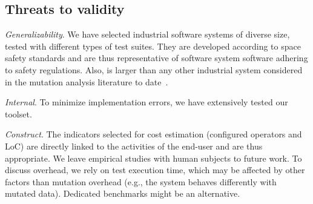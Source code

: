 






\subsection{Threats to validity} 
\label{sec:threats:damat}


\emph{Generalizability}. We have selected industrial software systems of diverse size, tested with different types of test suites. They are developed according to space safety standards and are thus  representative of software system software adhering to safety regulations. 
Also, \ESAIL is larger than any other industrial system considered in the mutation analysis literature to date~\cite{Ramler2017,delgado2018evaluation,Baker2013,denisov2018mull}.

{\emph{Internal}. To minimize implementation errors, we have extensively tested our toolset.}

{\emph{Construct}. The indicators selected for cost estimation (configured operators and LoC) are directly linked to the activities of the end-user and are thus appropriate. We leave empirical studies with human subjects to future work. To discuss overhead, we rely on test execution time, which may be affected by other factors than mutation overhead (e.g., the system behaves differently with mutated data). Dedicated benchmarks might be an alternative.}

